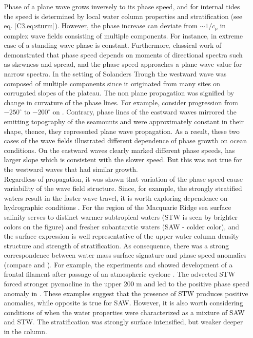 \documentclass[12pt]{article}
\begin{document}
Phase of a plane wave grows inversely to its phase speed, and for internal tides the speed is 
determined by local water column properties and stratification (see eq. \eqref{C3.eq:sturm}). 
However, the phase increase can deviate from $\sim 1/c_p$ in complex wave fields consisting of 
multiple components. For instance, in extreme case of a standing wave phase is constant. 
Furthermore, classical 
work of \cite{longuet1957statistical} demonstrated that phase speed depends on moments of 
directional spectra 
such as skewness and spread, and the phase speed approaches a plane wave value for narrow spectra. 
In the setting of Solanders Trough the westward wave was 
composed of 
multiple components since it originated from many sites on corrugated slopes of the plateau. The 
non plane propagation was signified by change in curvature of the phase 
lines. For example, consider progression from $-250^{\circ}$ to $-200^{\circ}$ on 
. Contrary, phase lines of the eastward waves mirrored the emitting 
topography of the seamounts and were approximately constant in their shape, thence, they 
represented plane wave propagation. As a result, these two cases of the wave fields illustrated 
different dependence of phase growth on ocean conditions. On  the eastward 
waves clearly marked different phase speeds,  has larger slope which is consistent with 
the slower speed. But this was not true for the westward waves that had similar growth.\\

Regardless of propagation, it was shown that variation of the phase speed cause variability of the 
wave field structure. Since, for example, the strongly stratified waters result in the faster wave 
travel, it is worth exploring dependence on hydrographic conditions . 
For the region of 
the Macquarie 
Ridge sea surface salinity serves to distinct warmer subtropical waters (STW is seen by brighter 
colors on the figure) and fresher subantarctic waters (SAW - colder color), and the surface 
expression is well representative of the upper water column density structure and strength of 
stratification. As consequence, there was a strong correspondence between water mass surface 
signature and phase speed anomalies (compare  and 
). For 
example, the experiments  and  showed development of a frontal filament 
after passage of an atmospheric cyclone . The advected STW forced 
stronger pycnocline in the upper 200 m  and led to the positive phase speed anomaly in . These examples suggest that 
the presence of STW produces positive anomalies, while opposite is true for SAW. 
However, it is also worth considering conditions of  when the water properties were 
characterized as a mixture of SAW and STW. The stratification was strongly surface intensified, but 
weaker deeper in the column.\\
\end{document}
